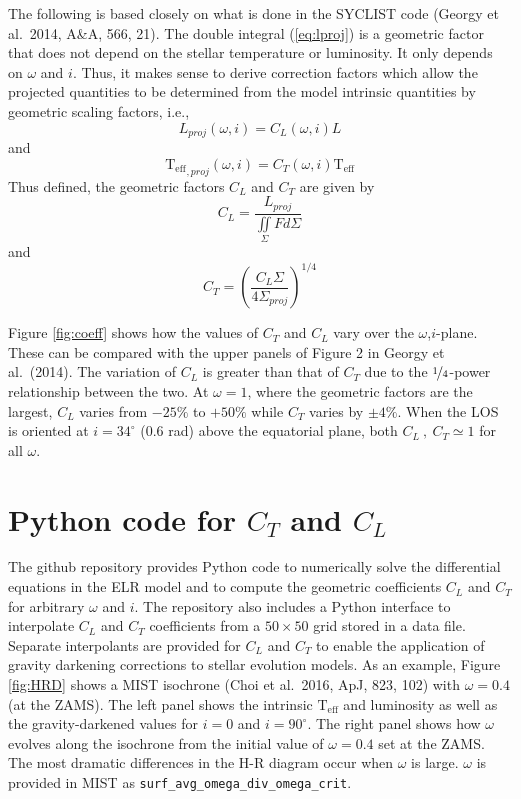 \documentclass[12pt]{article}
\newcommand{\Teff}{\mathrm{T_{eff}}}
\begin{document}
The following is based closely on what is done in the SYCLIST code
(Georgy et al.\ 2014, A\&A, 566, 21). The double integral (\ref{eq:lproj}) is a
geometric factor that does not depend on the stellar temperature or luminosity.
It only depends on $\omega$ and $i$. Thus, it makes sense to derive correction
factors which allow the projected quantities to be determined from the model
intrinsic quantities by geometric scaling factors, i.e.,
\begin{equation}
  L_{proj}(\omega,i) = C_L(\omega,i) L
\end{equation}
and
\begin{equation}
  \Teff_{,proj}(\omega,i) = C_T(\omega,i) \Teff
\end{equation}
Thus defined, the geometric factors $C_L$ and $C_T$ are given by
\begin{equation}
C_L = \frac{L_{proj} }{\iint\limits_\Sigma F d\Sigma}
\end{equation}
and
\begin{equation}
C_T = \left( \frac{C_L \Sigma}{4 \Sigma_{proj}} \right)^{1/4}
\end{equation}

Figure \ref{fig:coeff} shows how the values of $C_T$ and $C_L$ vary over the
$\omega$,$i$-plane. These can be compared with the upper panels of Figure 2
in Georgy et al.\ (2014). The variation of $C_L$ is greater than that of $C_T$
due to the $\nicefrac{1}{4}$-power relationship between the two. At $\omega=1$, where
the geometric factors are the largest, $C_L$ varies from $-25\%$ to
$+50\%$ while $C_T$ varies by $\pm4\%$. When the LOS is oriented at
$i=34^{\circ}$ ($0.6$ rad) above the equatorial plane, both $C_L~,~C_T \simeq 1$
for all $\omega$.

\section{Python code for $C_T$ and $C_L$}
The github repository provides Python code to numerically solve the differential equations in the ELR model
and to compute the geometric coefficients $C_L$ and $C_T$ for arbitrary $\omega$ and $i$. The repository
also includes a Python interface to interpolate $C_L$ and $C_T$ coefficients from a $50\times50$ grid
stored in a data file.  Separate interpolants are provided for $C_L$ and $C_T$ to enable the application
of gravity darkening corrections to stellar evolution models. As an example, Figure \ref{fig:HRD} shows
a MIST isochrone (Choi et al.\ 2016, ApJ, 823, 102) with $\omega=0.4$ (at the ZAMS). The left panel shows
the intrinsic $\Teff$ and luminosity as well as the gravity-darkened values for $i=0$ and $i=90^{\circ}$.
The right panel shows how $\omega$ evolves along the isochrone from the initial value of $\omega=0.4$ set
at the ZAMS. The most dramatic differences in the H-R diagram occur when $\omega$ is large. $\omega$ is
provided in MIST as \texttt{surf\_avg\_omega\_div\_omega\_crit}.
\end{document}
